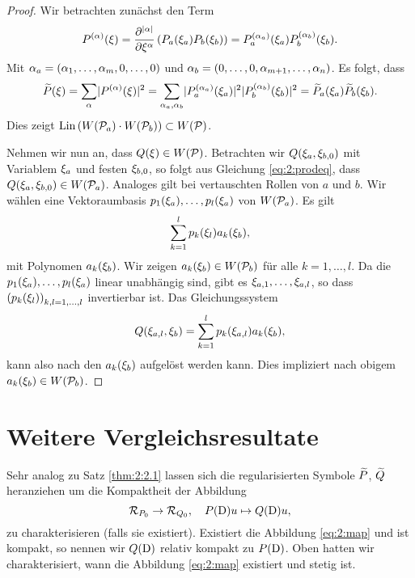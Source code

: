 \begin{proof}
Wir betrachten zunächst den Term
\begin{equation}
P^{(\alpha)}(\xi)
=\frac{\partial^{\lvert\alpha\rvert}}{\partial\xi^\alpha}\left(P_a(\xi_a)P_b(\xi_b)\right)
=P^{(\alpha_a)}_a(\xi_a)P^{(\alpha_b)}_b(\xi_b).
\end{equation}
Mit $\alpha_a=(\alpha_1,\dots,\alpha_m,0,\dots,0)$
und $\alpha_b=(0,\dots,0,\alpha_{m+1},\dots,\alpha_n)$.
Es folgt, dass
\begin{equation}\label{eq:2:prodeq}
\widetilde{P}(\xi)=\sum_\alpha\lvert P^{(\alpha)}(\xi)\rvert^2
=\sum_{\alpha_a,\alpha_b}\lvert P^{(\alpha_a)}_a(\xi_a)\rvert^2\lvert P^{(\alpha_b)}_b(\xi_b)\rvert^2
=\widetilde{P}_a(\xi_a)\widetilde{P}_b(\xi_b).
\end{equation}
Dies zeigt $\operatorname{Lin}\left(W(\mathcal P_a)\cdot W(\mathcal P_b)\right)\subset W(\mathcal P)$.

Nehmen wir nun an, dass $Q(\xi)\in W(\mathcal P)$.
Betrachten wir $Q(\xi_a,\xi_{b,0})$ mit Variablem $\xi_a$ und festen $\xi_{b,0}$,
so folgt aus Gleichung \eqref{eq:2:prodeq},
dass $Q(\xi_a,\xi_{b,0})\in W(\mathcal P_a)$.
Analoges gilt bei vertauschten Rollen von $a$ und $b$.
Wir wählen eine Vektoraumbasis $p_1(\xi_a),\dots,p_l(\xi_a)$ von $W(\mathcal P_a)$.
Es gilt
\begin{equation}
\sum_{k=1}^lp_k(\xi_l)a_k(\xi_b),
\end{equation}
mit Polynomen $a_k(\xi_b)$.
Wir zeigen $a_k(\xi_b)\in W(\mathcal P_b)$ für alle $k=1,\dots,l$.
Da die $p_1(\xi_a),\dots,p_l(\xi_a)$ linear unabhängig sind,
gibt es $\xi_{a,1},\dots,\xi_{a,l}$,
so dass $\left(p_k(\xi_l)\right)_{k,l=1,\dots,l}$ invertierbar ist.
Das Gleichungssystem
\begin{equation}
Q(\xi_{a,l},\xi_b)=\sum_{k=1}^lp_k(\xi_{a,l})a_k(\xi_b),
\end{equation}
kann also nach den $a_k(\xi_b)$ aufgelöst werden kann.
Dies impliziert nach obigem $a_k(\xi_b)\in W(\mathcal P_b)$.

\end{proof}

\section{Weitere Vergleichsresultate}

Sehr analog zu Satz \ref{thm:2:2.1} lassen sich die regularisierten
Symbole $\widetilde{P}$, $\widetilde{Q}$ heranziehen
um die Kompaktheit der Abbildung
\begin{equation}\label{eq:2:map}
\mathcal R_{P_0}\to\mathcal R_{Q_0},\quad P(\mathrm D)u\mapsto Q(\mathrm D)u,
\end{equation}
zu charakterisieren (falls sie existiert).
Existiert die Abbildung \eqref{eq:2:map} und ist kompakt,
so nennen wir $Q(\mathrm D)$ relativ kompakt zu $P(\mathrm D)$.
Oben hatten wir charakterisiert,
wann die Abbildung \eqref{eq:2:map} existiert und stetig ist.

